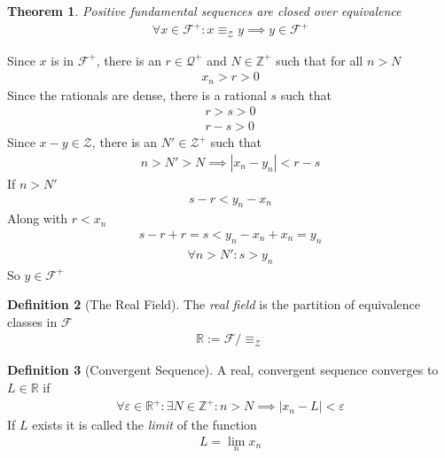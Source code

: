 \documentclass{amsart}
\numberwithin{equation}{section}
\let\oldendproof\endproof
\renewenvironment{proof}[1][\proofname]{%
  \setcounter{case}{0}
  \setcounter{step}{0}
  \oldproof[#1]%
}{\oldendproof}
\theoremstyle{plain}
\newtheorem{theorem}{Theorem}[section]
\theoremstyle{definition}
\newtheorem{definition}[theorem]{Definition}
\theoremstyle{remark}
\begin{document}
\begin{theorem}
  Positive fundamental sequences are closed over equivalence
  \begin{align}
    \forall x\in\mathcal{F}^+: x\equiv_\mathcal{Z} y \implies y\in\mathcal{F}^+
  \end{align}
\end{theorem}
\begin{proof}
  Since $x$ is in $\mathcal{F}^+$, there is an $r\in\mathcal{Q}^+$ and $N\in\mathbb{Z}^+$ such that for all $n>N$
  \begin{align}
    x_n > r>0
  \end{align}
  Since the rationals are dense, there is a rational $s$ such that
  \begin{align}
    r> s>0\\
    r-s>0
  \end{align}
  Since $x-y\in\mathcal{Z}$, there is an $N'\in\mathcal{Z}^+$ such that
  \begin{align}
    n> N'> N \implies |x_n - y_n| < r-s
  \end{align}
  If $n> N'$
  \begin{align}
    s-r < y_n - x_n
  \end{align}
  Along with $r< x_n$
  \begin{align}
    s- r+ r = s < y_n- x_n +x_n = y_n
  \end{align}
  \begin{align}
    \forall n>N': s>y_n
  \end{align}
  So $y\in\mathcal{F}^+$
\end{proof}

\begin{definition}[The Real Field]
  The \emph{real field} is the partition of equivalence classes in $\mathcal{F}$
  \begin{align}
    \mathbb{R} := \mathcal{F} / \equiv_\mathcal{Z}
  \end{align}
\end{definition}


\begin{definition}[Convergent Sequence]
  A real, convergent sequence converges to $L\in\mathbb{R}$ if
  \begin{align}
    \forall \varepsilon \in \mathbb{R}^+: \exists N \in \mathbb{Z}^+: n > N \implies |x_n - L | < \varepsilon
  \end{align}
  If $L$ exists it is called the \emph{limit} of the function
  \begin{align}
    L = \lim_n x_n
  \end{align}
\end{definition}
\end{document}
